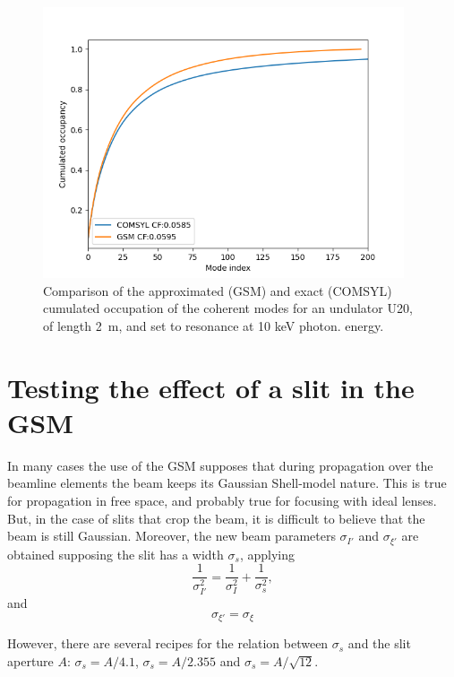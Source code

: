 \documentclass{iucr}              %
\begin{document}
\begin{figure}
    \centering
    \includegraphics[width=0.95\textwidth]{figures/FigureGSMvsCOMSYL.png}
    \caption{Comparison of the approximated (GSM) and exact (COMSYL) cumulated occupation of the coherent modes for an undulator U20, of length \SI{2}{\meter}, and set to resonance at 10 keV photon. energy.}
    \label{fig:GSMvsCOMSYL}
\end{figure}

\section{Testing the effect of a slit in the GSM}
\label{appendix:B}

In many cases the use of the GSM supposes that during propagation over the beamline elements the beam keeps its Gaussian Shell-model nature. This is true for propagation in free space, and probably true for focusing with ideal lenses. But, in the case of slits that crop the beam, it is difficult to believe that the beam is still Gaussian. Moreover, the new beam parameters $\sigma_{I'}$ and $\sigma_{\xi'}$ are obtained supposing the slit has a width $\sigma_s$, applying
\begin{equation}
    \frac{1}{\sigma_{I'}^2} = 
    \frac{1}{\sigma_{I}^2} +
    \frac{1}{\sigma_{s}^2},
\end{equation}
and
\begin{equation}
    \sigma_{\xi'} = \sigma_{\xi} 
\end{equation}

However, there are several recipes for the relation between $\sigma_s$ and the slit aperture $A$: $\sigma_s=A/4.1$, $\sigma_s=A/2.355$ and $\sigma_s=A/\sqrt{12}$.
\end{document}
